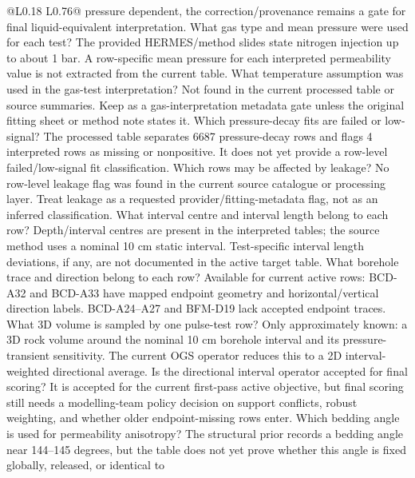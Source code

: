 \begin{longtable}{@{}L{0.18\textwidth} L{0.76\textwidth}@{}}
{pressure dependent, the correction/provenance remains a gate for final
liquid-equivalent interpretation.}
{ What gas type and mean pressure were used for each test?}
{The provided HERMES/method slides state nitrogen injection up to about 1 bar.  A
row-specific mean pressure for each interpreted permeability value is not extracted
from the current table.}
{ What temperature assumption was used in the gas-test interpretation?}
{Not found in the current processed table or source summaries.  Keep as a
gas-interpretation metadata gate unless the original fitting sheet or method note
states it.}
{ Which pressure-decay fits are failed or low-signal?}
{The processed table separates 6687 pressure-decay rows and flags 4 interpreted rows
as missing or nonpositive.  It does not yet provide a row-level failed/low-signal fit
classification.}
{ Which rows may be affected by leakage?}
{No row-level leakage flag was found in the current source catalogue or processing layer.
Treat leakage as a requested provider/fitting-metadata flag, not as an inferred
classification.}
{ What interval centre and interval length belong to each row?}
{Depth/interval centres are present in the interpreted tables; the source method uses
a nominal 10 cm static interval.  Test-specific interval length deviations, if any,
are not documented in the active target table.}
{ What borehole trace and direction belong to each row?}
{Available for current active rows: BCD-A32 and BCD-A33 have mapped endpoint geometry
and horizontal/vertical direction labels.  BCD-A24--A27 and BFM-D19 lack accepted
endpoint traces.}
{ What 3D volume is sampled by one pulse-test row?}
{Only approximately known: a 3D rock volume around the nominal 10 cm borehole interval
and its pressure-transient sensitivity.  The current OGS operator reduces this to a
2D interval-weighted directional average.}
{ Is the directional interval operator accepted for final scoring?}
{It is accepted for the current first-pass active objective, but final scoring still
needs a modelling-team policy decision on support conflicts, robust weighting, and
whether older endpoint-missing rows enter.}
{ Which bedding angle is used for permeability anisotropy?}
{The structural prior records a bedding angle near 144--145 degrees, but the table
does not yet prove whether this angle is fixed globally, released, or identical to
}
\end{longtable}
